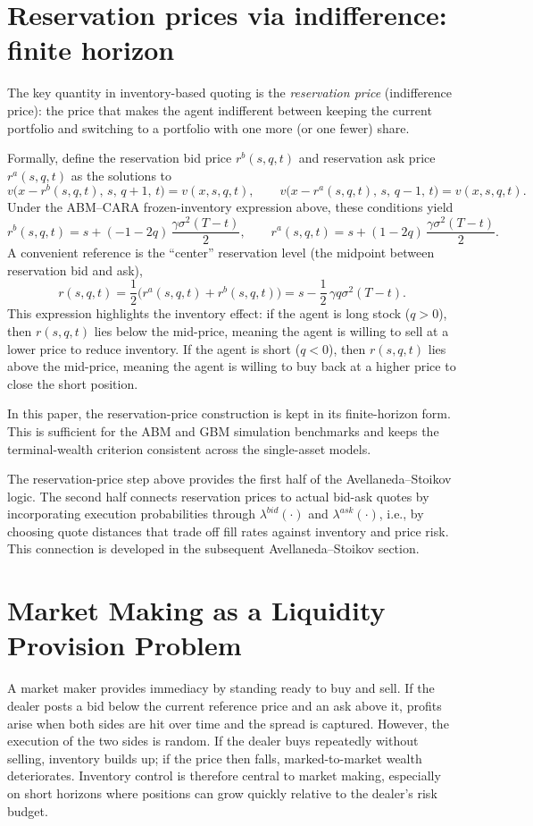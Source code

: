 \documentclass[a4paper,10pt,titlepage,oneside,openany]{book}
\theoremstyle{plain}\newtheorem{theorem}{Theorem}[chapter]
\theoremstyle{definition}\newtheorem{definition}{Definition}[chapter]
\theoremstyle{remark}\newtheorem{remark}{Remark}[chapter]
\begin{document}
\section{Reservation prices via indifference: finite horizon}
The key quantity in inventory-based quoting is the \emph{reservation price} (indifference price): the price that makes the agent indifferent between keeping the current portfolio and switching to a portfolio with one more (or one fewer) share.

Formally, define the reservation bid price $r^b(s,q,t)$ and reservation ask price $r^a(s,q,t)$ as the solutions to
\[
v\bigl(x-r^b(s,q,t),\,s,\,q+1,\,t\bigr)=v(x,s,q,t),
\qquad
v\bigl(x-r^a(s,q,t),\,s,\,q-1,\,t\bigr)=v(x,s,q,t).
\]
Under the ABM--CARA frozen-inventory expression above, these conditions yield
\[
r^b(s,q,t)
=
s+(-1-2q)\,\frac{\gamma\sigma^2(T-t)}{2},
\qquad
r^a(s,q,t)
=
s+(1-2q)\,\frac{\gamma\sigma^2(T-t)}{2}.
\]
A convenient reference is the ``center'' reservation level (the midpoint between reservation bid and ask),
\[
r(s,q,t)
=
\frac12\bigl(r^a(s,q,t)+r^b(s,q,t)\bigr)
=
s-\frac12\,\gamma q\sigma^2(T-t).
\]
This expression highlights the inventory effect: if the agent is long stock ($q>0$), then $r(s,q,t)$ lies below the mid-price, meaning the agent is willing to sell at a lower price to reduce inventory. If the agent is short ($q<0$), then $r(s,q,t)$ lies above the mid-price, meaning the agent is willing to buy back at a higher price to close the short position.

In this paper, the reservation-price construction is kept in its finite-horizon form. This is sufficient for the ABM and GBM simulation benchmarks and keeps the terminal-wealth criterion consistent across the single-asset models.

The reservation-price step above provides the first half of the Avellaneda--Stoikov logic. The second half connects reservation prices to actual bid-ask quotes by incorporating execution probabilities through $\lambda^{bid}(\cdot)$ and $\lambda^{ask}(\cdot)$, i.e., by choosing quote distances that trade off fill rates against inventory and price risk. This connection is developed in the subsequent Avellaneda--Stoikov section.

\section{Market Making as a Liquidity Provision Problem}
A market maker provides immediacy by standing ready to buy and sell. If the dealer posts a bid below the current reference price and an ask above it, profits arise when both sides are hit over time and the spread is captured. However, the execution of the two sides is random. If the dealer buys repeatedly without selling, inventory builds up; if the price then falls, marked-to-market wealth deteriorates. Inventory control is therefore central to market making, especially on short horizons where positions can grow quickly relative to the dealer's risk budget.
\end{document}
